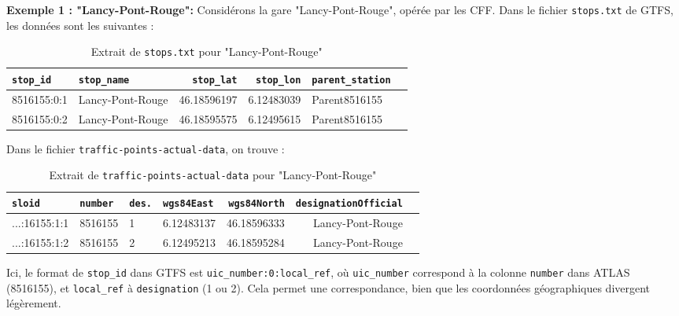 \textbf{Exemple 1 : "Lancy-Pont-Rouge":}
\newline
Considérons la gare "Lancy-Pont-Rouge", opérée par les CFF. Dans le fichier \texttt{stops.txt} de GTFS, les données sont les suivantes :

\begin{table}[h]
\caption{Extrait de \texttt{stops.txt} pour "Lancy-Pont-Rouge"}
\label{tab:stops_lancy_2}
\centering
\begin{tabular}{l l r r l l}
\toprule
\texttt{stop\_id} & \texttt{stop\_name} & \texttt{stop\_lat} & \texttt{stop\_lon} & \texttt{parent\_station} \\
\midrule
8516155:0:1 & Lancy-Pont-Rouge & 46.18596197 & 6.12483039 & Parent8516155 \\
8516155:0:2 & Lancy-Pont-Rouge & 46.18595575 & 6.12495615 & Parent8516155 \\
\bottomrule
\end{tabular}
\end{table}

Dans le fichier \texttt{traffic-points-actual-data}, on trouve :

\begin{table}[h]
\caption{Extrait de \texttt{traffic-points-actual-data} pour "Lancy-Pont-Rouge"}
\label{tab:traffic_lancy_2}
\centering
\begin{tabular}{l l l l r r l}
\toprule
\texttt{sloid} & \texttt{number} & \texttt{des.} & \texttt{wgs84East} & \texttt{wgs84North} & \texttt{designationOfficial} \\
\midrule
...:16155:1:1 & 8516155 & 1  & 6.12483137 & 46.18596333 & Lancy-Pont-Rouge \\
...:16155:1:2 & 8516155 & 2  & 6.12495213 & 46.18595284 & Lancy-Pont-Rouge \\
\bottomrule
\end{tabular}
\end{table}

Ici, le format de \texttt{stop\_id} dans GTFS est \texttt{uic\_number:0:local\_ref}, où \texttt{uic\_number} correspond à la colonne \texttt{number} dans ATLAS (8516155), et \texttt{local\_ref} à \texttt{designation} (1 ou 2). Cela permet une correspondance, bien que les coordonnées géographiques divergent légèrement.

